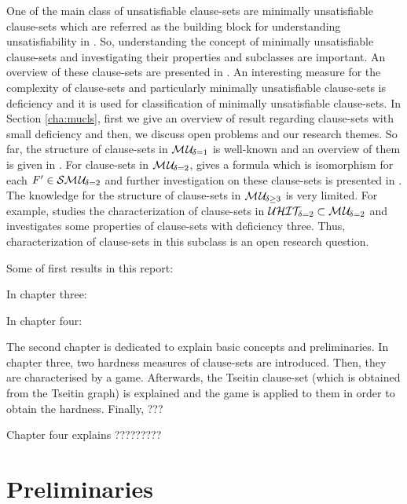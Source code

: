 \documentclass{report}
\begin{document}
One of the main class of unsatisfiable clause-sets are minimally unsatisfiable clause-sets which are referred as the building block for understanding unsatisfiability in \cite{KullmannZhao2010Extremal}. So, understanding the concept of minimally unsatisfiable clause-sets and investigating their properties and subclasses are important. An overview of these clause-sets are presented in \cite{KullmannZhao2010Extremal, Kullmann2007HandbuchMU,KullmannZhao2012ConfluenceJ}. An interesting measure for the complexity of clause-sets and particularly minimally unsatisfiable clause-sets is deficiency and it is used for classification of minimally unsatisfiable clause-sets. In Section \ref{cha:mucls}, first we give an overview of result regarding clause-sets with small deficiency and then, we discuss open problems and our research themes. So far, the structure of clause-sets in $\mathcal{M\hspace{0.8pt}U}_{\!\delta=1}$ is well-known and an overview of them is given in \cite{KullmannZhao2010Extremal, Ku99dK,KleineBuening2000SubclassesMU,DDK98}. For clause-sets in $\mathcal{M\hspace{0.8pt}U}_{\!\delta=2}$, \cite{KleineBuening2000SubclassesMU} gives a formula which is isomorphism for each $F' \in \mathcal{S}\mathcal{M\hspace{0.8pt}U}_{\!\delta=2}$ and further investigation on these clause-sets is presented in \cite{KullmannZhao2010Extremal, KleineBuening2000SubclassesMU, KullmannZhao2012ConfluenceJ}. The knowledge for the structure of clause-sets in $\mathcal{M\hspace{0.8pt}U}_{\!\delta \ge 3}$ is very limited. For example, \cite{KullmannZhao2016UHitSAT} studies the characterization of clause-sets in $\mathcal{U}\mathcal{HIT}_{\!\!\delta=2} \subset \mathcal{M\hspace{0.8pt}U}_{\!\delta=2}$ and \cite{KullmannZhao2010Extremal} investigates some properties of clause-sets with deficiency three. Thus, characterization of clause-sets in this subclass is an open research question.

Some of first results in this report:

In chapter three:

In chapter four: 

The second chapter is dedicated to explain basic concepts and preliminaries. In chapter three, two hardness measures of clause-sets are introduced. Then, they are characterised by a game. Afterwards, the Tseitin clause-set (which is obtained from the Tseitin graph) is explained and the game is applied to them in order to obtain the hardness. Finally, ???

Chapter four explains ?????????

\chapter{Preliminaries}
\label{cha:Preliminaries}
\end{document}
